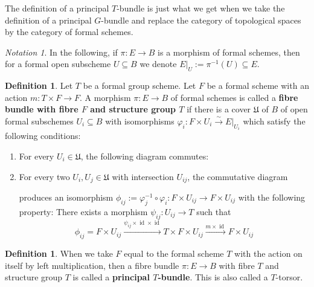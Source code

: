 \documentclass[10pt,oneside]{amsart}
\theoremstyle{definition}
\newtheorem{definition}[theorem]{Definition}
\theoremstyle{remark}
\newtheorem*{notation}{Notation}
\begin{document}
	
	The definition of a principal $T$-bundle is just what we get when we take the definition of a principal $G$-bundle and replace the category of topological spaces by the category of formal schemes.
	\begin{notation}
		In the following, if $\pi:E\rightarrow B$ is a morphism of formal schemes, then for a formal open subscheme $U\subseteq B$ we denote $E|_U:=\pi^{-1}(U)\subseteq E$.
	\end{notation}
	\begin{definition}\label{definition principal T-bundle}
		Let $T$ be a formal group scheme. Let $F$ be a formal scheme with an action $m:T\times F\rightarrow F$.
		A morphism $\pi:E\rightarrow B$ of formal schemes is called a \textbf{fibre bundle with fibre $F$ and structure group $T$} if there is a cover $\mathfrak U$ of $B$ of open formal subschemes $U_i\subseteq B$ with isomorphisms $\varphi_i:F\times U_i \xrightarrow{\sim} E|_{U_i}$ which satisfy the following conditions:
		\begin{enumerate}[label=(\alph*)]
			\item For every $U_i\in \mathfrak U$, the following diagram commutes:
			\begin{center}
			\end{center}
			\item For every two $U_i,U_j\in \mathfrak U$ with intersection $U_{ij}$, the commutative diagram
			\begin{center}
			\end{center}
			produces an isomorphism $\phi_{ij}:=\varphi_j^{-1}\circ\varphi_i: F\times U_{ij}\rightarrow F\times U_{ij}$ with the following property: There exists a morphism $\psi_{ij}:U_{ij}\rightarrow T$ such that
			\[\phi_{ij}=F\times U_{ij} \xrightarrow{\psi_{ij}\times \operatorname{id}\times\operatorname{id}} T\times F\times U_{ij}\xrightarrow{m\times \operatorname{id}} F\times U_{ij}\]
		\end{enumerate}
	\end{definition}
	\begin{definition}
		When we take $F$ equal to the formal scheme $T$ with the action on itself by left multiplication, then a fibre bundle $\pi:E\rightarrow B$ with fibre $T$ and structure group $T$ is called a \textbf{principal $T$-bundle}. This is also called a $T$-torsor.
	\end{definition}
	
\end{document}
